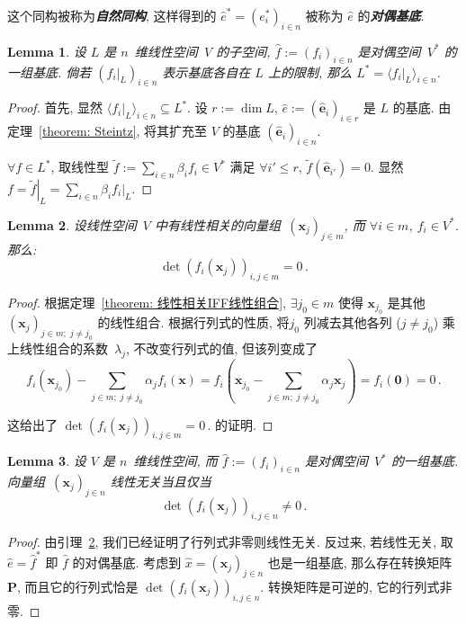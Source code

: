 \documentclass[openany]{ctexbook}
\newcommand*{\indexbf}[1]{\emph{\textbf{#1}}\index{#1}} %
\theoremstyle{plain}
\newtheorem{lemma}{Lemma} %
\theoremstyle{definition}
\newcommand*{\basis}[1]{\hat{\boldsymbol{#1}}} %
\newcommand*{\bv}{\boldsymbol} %
\begin{document}
这个同构被称为\indexbf{自然同构}, 这样得到的 $\hat e^* = (e^*_i)_{i \in n}$ 被称为 $\hat e$ 的\indexbf{对偶基底}.

\begin{lemma}\label{lemma: 子空间的对偶}
	设 $L$ 是 $n$~维线性空间~$V$ 的子空间, $\hat f := (f_i)_{i \in n}$ 是对偶空间~$V^*$ 的一组基底. 
	倘若 $(\left. f_i \right|_L)_{i \in n}$ 表示基底各自在 $L$ 上的限制,
	那么 $L^* = \langle \left. f_i \right|_L \rangle_{i \in n}$.
\end{lemma}
\begin{proof}
	首先, 显然 $\langle \left. f_i \right|_L \rangle_{i \in n} \subseteq L^*$.
	设 $r := \dim L$, $\hat e := (\basis e_i)_{i \in r}$ 是 $L$ 的基底. 
	由定理~\ref{theorem: Steintz}, 将其扩充至 $V$ 的基底 $(\basis e_i)_{i \in n}$.

	$\forall f \in L^*$, 取线性型 $\tilde f := \sum_{i \in n} \beta_i f_i \in V^*$ 满足 $\forall i' \leq r$, $\tilde f(\basis e_{i'}) = 0$. 
	显然 $f = \left. \tilde f \right|_L = \sum_{i \in n} \beta_i \left. f_i \right|_L$.
\end{proof}


\begin{lemma}\label{lemma: 线性相关则行列式为0}
	设线性空间~$V$ 中有线性相关的向量组~$(\bv x_j)_{j\in m}$, 而 $\forall i \in m$, $f_i \in V^*$. 那么:
	\begin{equation*}
		\det\left( 
			f_i (\bv x_j)
		 \right)_{i,j \in m} = 0\,.
	\end{equation*}
\end{lemma}
\begin{proof}
	根据定理~\ref{theorem: 线性相关IFF线性组合}, $\exists j_0 \in m$ 使得 $\bv x_{j_0}$ 是其他 $(\bv x_j)_{j\in m;\; j \neq j_0}$ 的线性组合. 
	根据行列式的性质, 将$j_0$ 列减去其他各列 ($j \neq j_0$) 乘上线性组合的系数~$\lambda_j$, 不改变行列式的值, 但该列变成了
	\begin{equation*}
		f_i(\bv x_{j_0}) 
			- \sum_{j \in m;\; j \neq j_0} \alpha_j f_i(\bv x)
			= f_i\left(\bv x_{j_0} 
					- \sum_{j \in m;\; j \neq j_0} \alpha_j \bv x_j
				\right)
			= f_i(\bv 0)
			= 0\,.
	\end{equation*}
	
	这给出了 $
		\det\left( 
			f_i (\bv x_j)
		 \right)_{i,j \in m} = 0\,.
	$ 的证明.
\end{proof}

\begin{lemma}\label{lemma: 线性无关IFF行列式非零}
	设 $V$ 是 $n$~维线性空间, 而 $\hat f := (f_i)_{i \in n}$ 是对偶空间~$V^*$ 的一组基底.
	向量组~$(\bv x_j)_{j \in n}$ 线性无关当且仅当
	\begin{equation*}
		\det(f_i(\bv x_j))_{i,j \in n} \neq 0\,.
	\end{equation*}
\end{lemma}
\begin{proof}
	由引理~\ref{lemma: 线性相关则行列式为0}, 我们已经证明了行列式非零则线性无关. 
	反过来, 若线性无关, 取 $\hat e = \hat f^*$ 即 $\hat f$ 的对偶基底. 
	考虑到 $\hat x = (\bv x_j)_{j \in n}$ 也是一组基底, 那么存在转换矩阵 $\bv P$, 而且它的行列式恰是 $\det(f_i(\bv x_j))_{i,j \in n}$. 
	转换矩阵是可逆的, 它的行列式非零.
\end{proof}
\end{document}
